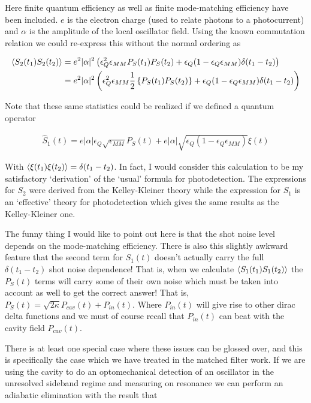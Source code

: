 \documentclass[12pt]{article}
\begin{document}
Here finite quantum efficiency as well as finite mode-matching efficiency have been included. $e$ is the electron charge (used to relate photons to a photocurrent) and $\alpha$ is the amplitude of the local oscillator field.
Using the known commutation relation we could re-express this without the normal ordering as

\begin{align}
\Braket{S_2(t_1)S_2(t_2)} &=  e^2|\alpha|^2\left(\epsilon_Q^2\epsilon_{MM}P_S(t_1)P_S(t_2) + \epsilon_Q(1-\epsilon_Q \epsilon_{MM})\delta(t_1-t_2)\right)\\
&= e^2|\alpha|^2\left(\epsilon_Q^2\epsilon_{MM}\frac{1}{2}\left\{P_S(t_1)P_S(t_2)\right\}+ \epsilon_Q(1-\epsilon_Q \epsilon_{MM})\delta(t_1-t_2)\right)
\end{align}

Note that these same statistics could be realized if we defined a quantum operator

\begin{align}
\hat{S}_1(t) = e|\alpha|\epsilon_Q\sqrt{\epsilon_{MM}}P_S(t) + e|\alpha| \sqrt{\epsilon_Q(1-\epsilon_Q\epsilon_{MM})}\xi(t)
\end{align}

With $\Braket{\xi(t_1)\xi(t_2)} = \delta(t_1-t_2)$. In fact, I would consider this calculation to be my satisfactory `derivation' of the `usual' formula for photodetection. The expressions for $S_2$ were derived from the Kelley-Kleiner theory while the expression for $S_1$ is an `effective' theory for photodetection which gives the same results as the Kelley-Kleiner one.

The funny thing I would like to point out here is that the shot noise level depends on the mode-matching efficiency. There is also this slightly awkward feature that the second term for $S_1(t)$ doesn't actually carry the full $\delta(t_1-t_2)$ shot noise dependence! That is, when we calculate $\Braket{S_1(t_1)S_1(t_2)}$ the $P_S(t)$ terms will carry some of their own noise which must be taken into account as well to get the correct answer! That is, $P_S(t) = \sqrt{2\kappa}P_{cav}(t) + P_{in}(t)$. Where $P_{in}(t)$ will give rise to other dirac delta functions and we must of course recall that $P_{in}(t)$ can beat with the cavity field $P_{cav}(t)$.

There is at least one special case where these issues can be glossed over, and this is specifically the case which we have treated in the matched filter work. If we are using the cavity to do an optomechanical detection of an oscillator in the unresolved sideband regime and measuring on resonance we can perform an adiabatic elimination with the result that
\end{document}
